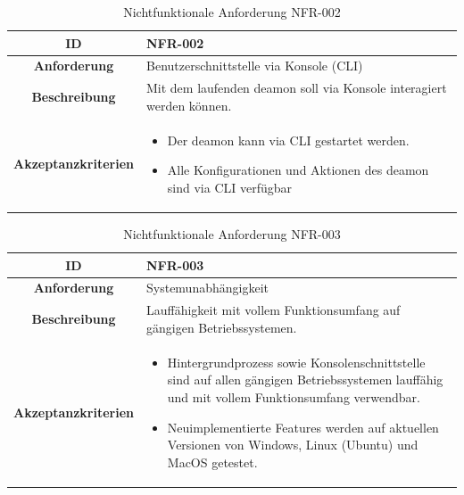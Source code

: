 \documentclass[a4paper,12pt]{report}
\begin{document}
    \begin{table}[h!]
        \centering
        \setlength{\leftmargini}{0.4cm}
        \begin{tabular}{|c|p{10cm}|}
            \hline
            \textbf{ID}           & NFR-002                                                              \\ \hline
            \textbf{Anforderung}  & Benutzerschnittstelle via Konsole (CLI)                              \\ \hline
            \textbf{Beschreibung} & Mit dem laufenden deamon soll via Konsole interagiert werden können. \\ \hline
            \textbf{Akzeptanzkriterien} &
            \begin{itemize}
                \item Der deamon kann via CLI gestartet werden.
                \item Alle Konfigurationen und Aktionen des deamon sind via CLI verfügbar
            \end{itemize}
            \\ \hline
        \end{tabular}
        \caption{Nichtfunktionale Anforderung NFR-002}\label{tab:table4}
    \end{table}

    \begin{table}[h!]
        \centering
        \setlength{\leftmargini}{0.4cm}
        \begin{tabular}{|c|p{10cm}|}
            \hline
            \textbf{ID}           & NFR-003                                                                 \\ \hline
            \textbf{Anforderung}  & Systemunabhängigkeit                                                    \\ \hline
            \textbf{Beschreibung} & Lauffähigkeit mit vollem Funktionsumfang auf gängigen Betriebssystemen. \\ \hline
            \textbf{Akzeptanzkriterien} &
            \begin{itemize}
                \item Hintergrundprozess sowie Konsolenschnittstelle sind auf allen gängigen Betriebssystemen lauffähig und mit vollem Funktionsumfang verwendbar.
                \item Neuimplementierte Features werden auf aktuellen Versionen von Windows, Linux (Ubuntu) und MacOS getestet.
            \end{itemize}
            \\ \hline
        \end{tabular}
        \caption{Nichtfunktionale Anforderung NFR-003}\label{tab:table5}
    \end{table}
\end{document}
